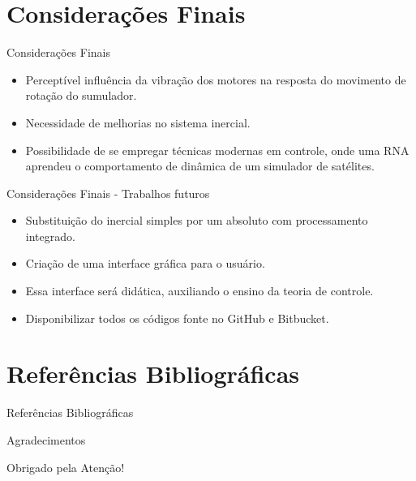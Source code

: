 \documentclass[aspectratio=169]{beamer}
\begin{document}

\section{Considerações Finais}
	\begin{frame}{Considerações Finais}
    \begin{itemize}
        	\justifying
			\item Perceptível influência da vibração dos motores na resposta do movimento de rotação do sumulador.
			\item Necessidade de melhorias no sistema inercial.
			\item Possibilidade de se empregar técnicas modernas em controle, onde uma RNA aprendeu o comportamento de dinâmica de um simulador de satélites.
		\end{itemize}
\end{frame}


\begin{frame}{Considerações Finais - Trabalhos futuros}
    \begin{itemize}
        \justifying
		\item Substituição do inercial simples por um absoluto com processamento integrado. 
		\item Criação de uma interface gráfica para o usuário.
		\item Essa interface será didática, auxiliando o ensino da teoria de controle.  
		\item Disponibilizar todos os códigos fonte no GitHub e Bitbucket.
		\end{itemize}
\end{frame}


\section{Referências Bibliográficas}
\begin{frame}[allowframebreaks]{Referências Bibliográficas}
	
\end{frame}


\begin{frame}{Agradecimentos}
		\begin{center}
			{\Huge Obrigado pela Atenção!}
		\end{center}
\end{frame}
\end{document}
